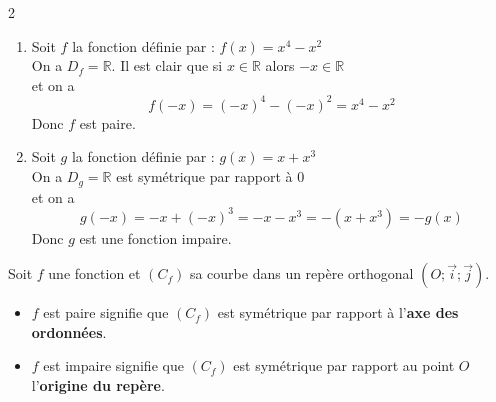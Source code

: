 \begin{Exemple}[][10 min]
\begin{multicols}{2}
\begin{enumerate}
    \item Soit $f$ la fonction définie par :  $f(x) = x^4 - x^2$ 
    \vspace{0.1cm} \\
    On a $D_f = \mathbb{R}$. Il est clair que si $x \in \mathbb{R}$ alors $-x \in \mathbb{R}$ \\
    et on a $$f(-x) = (-x)^4 - (-x)^2 = x^4 - x^2$$ 
    Donc $f$ est paire.

    \columnbreak
    
    \item Soit $g$ la fonction définie par : $g(x) = x + x^3$ 
    \vspace{0.1cm} \\
    On a $D_g = \mathbb{R}$ est symétrique par rapport à $0$ \\
    et on a $$g(-x) = -x + (-x)^3 = -x - x^3 = -(x + x^3) = -g(x)$$ 
    Donc $g$ est une fonction impaire.
\end{enumerate}
\end{multicols}
\end{Exemple}









\begin{Propriete}[][5 min]
Soit $f$ une fonction et $(C_f)$ sa courbe dans un repère orthogonal $(O ; \vec{i} ; \vec{j})$.
\begin{itemize}
    \item $f$ est paire signifie que $(C_f)$ est symétrique par rapport à l'\textbf{axe des ordonnées}.
    \item $f$ est impaire signifie que $(C_f)$ est symétrique par rapport au point $O$ l'\textbf{origine du repère}.
\end{itemize}
\end{Propriete}

